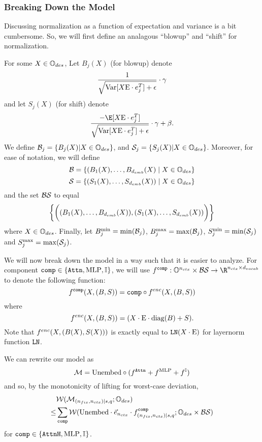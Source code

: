 \subsubsection*{Breaking Down the Model}
Discussing normalization as a function of expectation and variance is a bit cumbersome.
So, we will first define an analagous ``blowup'' and ``shift'' for normalization.

\begin{definition}
	\label{def:blowup_shift}
	For some $X \in \mathbb{O}_{des}$, Let $B_j(X)$ (for blowup) denote
	\[
		\frac{1}{\sqrt{\mathrm{Var}[X \text{E} \cdot e_j^T] + \epsilon}} \cdot \gamma
	\]
	and let $S_j(X)$ (for shift) denote
	\[
		\frac{-\E[X \Embed \cdot e_j^T]}{\sqrt{\Var[X \Embed \cdot e_j^T] + \eps}} \cdot \gamma + \beta.
	\]
	We define $\mathcal{B}_j = \{B_j(X) | X \in  \mathbb{O}_{des} \}$, and  $\mathcal{S}_j  = \{S_j(X) | X \in  \mathbb{O}_{des} \}$.
	Moreover, for ease of notation, we will define
	\[
		\mathcal{B} = \{ (B_1(X), \dots, B_{d_{emb}}(X) \mid X \in \mathbb{O}_{des}\}
	\]
	\[
		\mathcal{S} = \{ (S_1(X), \dots, S_{d_{emb}}(X)) \mid X \in \mathbb{O}_{des} \}
	\]
	and the set $\mathcal{B}\mathcal{S}$ to equal
	\[
		\left\{ \bigg((B_1(X), \dots, B_{d_{emb}}(X)), (S_1(X), \dots, S_{d_{emb}}(X))\bigg)  \right\}
	\]
	where $X \in \mathbb{O}_{des}$.
	Finally, let $B^{\min}_j = \min(\mathcal{B}_j) $, $B^{\max}_j = \max(\mathcal{B}_j)$, $S^{\min}_j = \min(\mathcal{S}_j)$ and $S^{\max}_j = \max(\mathcal{S}_j)$.
\end{definition}

We will now break down the model in a way such that it is easier to analyze.
For component ${\texttt{comp}} \in \{\texttt{Attn}, \text{MLP}, \mathbb{I}\}$, we will use $f^{\component} : \OneHotSpace^\nctx \times \blowupSet\shiftSet \to \R^{\nctx \times \dVocab}$ to denote the following function:
\[
	f^{{\texttt{comp}}}(X, (B, S)) = {\texttt{comp}} \circ f^{enc}(X, (B, S)) 
\]
where
\[
	f^{enc}(X, (B, S)) = (X \cdot \text{E} \cdot \mathrm{diag}(B) + S).
\]
Note that $f^{enc}(X, (B(X), S(X)))$ is exactly equal to $\texttt{LN}(X \cdot \text{E})$ for layernorm function $\texttt{LN}$.

We can rewrite our model as
\[
    \mathcal{M} = \mathrm{Unembed} \circ (f^{\texttt{Attn}} + f^{\text{MLP}} + f^{\mathbb{I}}) 
\]
and so, by the monotonicity of lifting for worst-case deviation,
\begin{align*}    
    &\mathcal{W}(\mathcal{M}_{(n_{fix}, {n_{ctx}}) \mid {s}, q}; \mathbb{O}_{des}) \\
    \leq& \sum_{{\texttt{comp}}} \mathcal{W}(\mathrm{Unembed} \cdot \vec{e}_{n_{ctx}} \cdot f^{{\texttt{comp}}}_{(n_{fix}, {n_{ctx}}) \mid {s}, q}; \mathbb{O}_{des} \times \mathcal{B} \mathcal{S})
\end{align*}
for ${\texttt{comp}} \in \{\texttt{AttnH}, \text{MLP}, \mathbb{I}\}$.


